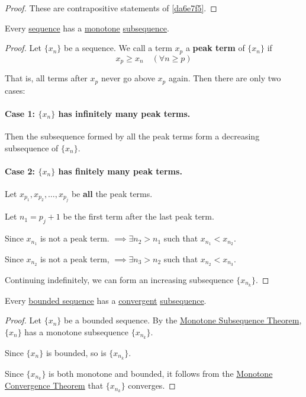 \begin{proof}
  These are contrapositive statements of \autoref{da6e7f5}.
\end{proof}

\label{dddb70e}

Every \href{b5fa0e4}{sequence} has a \href{feae1b2}{monotone}
\href{c6b3a49}{subsequence}.

\begin{proof}
  \def\xn{\{x_n\}}

  Let $\xn$ be a sequence. We call a term $x_p$ a \textbf{peak term} of $\xn$
  if
  $$
    x_p\geq x_n\quad(\forall n\geq p)
  $$

  That is, all terms after $x_p$ never go above $x_p$ again. Then there are
  only two cases:

  \paragraph{Case 1: $\xn$ has infinitely many peak terms.}

  Then the subsequence formed by all the peak terms form a decreasing
  subsequence of $\xn$.

  \paragraph{Case 2: $\xn$ has finitely many peak terms.}

  Let $x_{p_1},x_{p_2},\ldots,x_{p_j}$ be \textbf{all} the peak terms.

  Let $n_1=p_j+1$ be the first term after the last peak term.

  Since $x_{n_1}$ is not a peak term. $\implies\exists n_2>n_1$ such that
  $x_{n_1}<x_{n_2}$.

  Since $x_{n_2}$ is not a peak term, $\implies\exists n_3>n_2$ such that
  $x_{n_2}<x_{n_3}$.

  Continuing indefinitely, we can form an increasing subsequence $\{x_{n_k}\}$.
\end{proof}

\label{d277ad0}

Every \href{d5ed299}{bounded sequence} has a \href{de3e28a}{convergent}
\href{c6b3a49}{subsequence}.

\begin{proof}
  \def\xn{\{x_n\}}
  \def\xnk{\{x_{n_k}\}}

  Let $\xn$ be a bounded sequence. By the \href{dddb70e}{Monotone Subsequence
  Theorem}, $\xn$ has a monotone subsequence $\xnk$.

  Since $\xn$ is bounded, so is $\xnk$.

  Since $\xnk$ is both monotone and bounded, it follows from the
  \href{cc11aa4}{Monotone Convergence Theorem} that $\xnk$ converges.
\end{proof}

